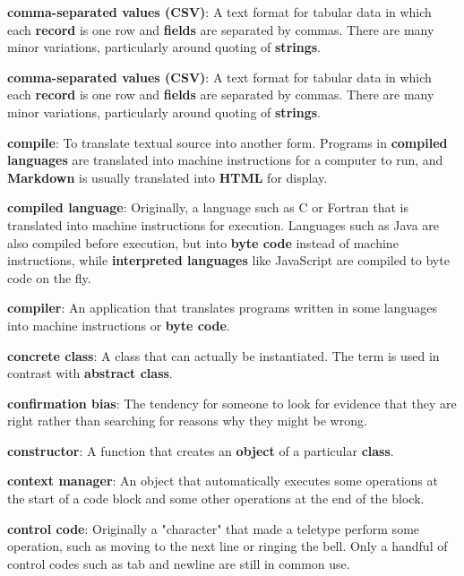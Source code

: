 \documentclass{scrbook}
\newcommand{\glosskey}[1]{\textbf{#1}}
\begin{document}
\noindent \textbf{\glosskey{comma-separated values} (CSV)}: 
A text format for tabular data in which each \glosskey{record} is one row and \glosskey{fields} are separated by commas. There are many minor variations, particularly around quoting of \glosskey{strings}.


\noindent \textbf{\glosskey{comma-separated values} (CSV)}: 
A text format for tabular data in which each \glosskey{record} is one row and \glosskey{fields} are separated by commas. There are many minor variations, particularly around quoting of \glosskey{strings}.


\noindent \textbf{\glosskey{compile}}: 
To translate textual source into another form. Programs in \glosskey{compiled languages} are translated into machine instructions for a computer to run, and \glosskey{Markdown} is usually translated into \glosskey{HTML} for display.


\noindent \textbf{\glosskey{compiled language}}: 
Originally, a language such as C or Fortran that is translated into machine instructions for execution. Languages such as Java are also compiled before execution, but into \glosskey{byte code} instead of machine instructions, while \glosskey{interpreted languages} like JavaScript are compiled to byte code on the fly.


\noindent \textbf{\glosskey{compiler}}: 
An application that translates programs written in some languages into machine instructions or \glosskey{byte code}.


\noindent \textbf{\glosskey{concrete class}}: 
A class that can actually be instantiated. The term is used in contrast with \glosskey{abstract class}.


\noindent \textbf{\glosskey{confirmation bias}}: 
The tendency for someone to look for evidence that they are right rather than searching for reasons why they might be wrong.


\noindent \textbf{\glosskey{constructor}}: 
A function that creates an \glosskey{object} of a particular \glosskey{class}.


\noindent \textbf{\glosskey{context manager}}: 
An object that automatically executes some operations at the start of a code block and some other operations at the end of the block.


\noindent \textbf{\glosskey{control code}}: 
Originally a "character" that made a teletype perform some operation, such as moving to the next line or ringing the bell. Only a handful of control codes such as tab and newline are still in common use.
\end{document}
